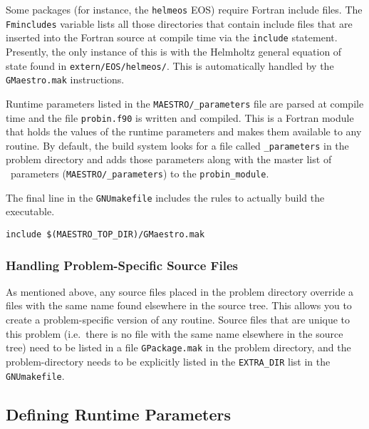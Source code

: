 Some packages (for instance, the {\tt helmeos}
EOS) require Fortran include files.  The {\tt Fmincludes} variable
lists all those directories that contain include files that are
inserted into the Fortran source at compile time via the {\tt include}
statement.  Presently, the only instance of this is with the Helmholtz
general equation of state found in {\tt extern/EOS/helmeos/}.  This is
automatically handled by the {\tt GMaestro.mak} instructions.

Runtime parameters listed in the {\tt MAESTRO/\_parameters} file are
parsed at compile time and the file {\tt probin.f90} is written and
compiled.  This is a Fortran module that holds the values of the
runtime parameters and makes them available to any routine.  By
default, the build system looks for a file called {\tt \_parameters}
in the problem directory and adds those parameters along with the
master list of \maestro\ parameters ({\tt MAESTRO/\_parameters}) to
the {\tt probin\_module}.

The final line in the {\tt GNUmakefile} includes the rules to actually
build the executable.
\begin{lstlisting}[language={[gnu]make},mathescape=false]
  include $(MAESTRO_TOP_DIR)/GMaestro.mak
\end{lstlisting}


\subsubsection{Handling Problem-Specific Source Files}

As mentioned above, any source files placed in the problem directory
override a files with the same name found elsewhere in the source
tree.  This allows you to create a problem-specific version of any
routine.  Source files that are unique to this problem (i.e.\ there is
no file with the same name elsewhere in the source tree) need to be
listed in a file {\tt GPackage.mak} in the problem directory, and
the problem-directory needs to be explicitly listed in the {\tt EXTRA\_DIR}
list in the {\tt GNUmakefile}.


\subsection{Defining Runtime Parameters}

\label{sec:def_runtime_param}


